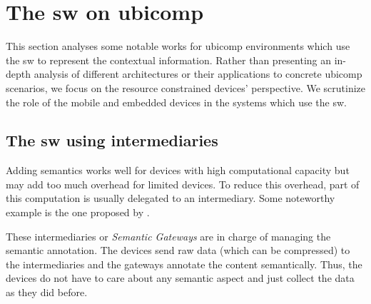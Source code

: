 \section{The \acl{sw} on \acs{ubicomp}}
\label{sec:soa_sw_ubicomp}


This section analyses some notable works for \ac{ubicomp} environments which use the \acf{sw} to represent the contextual information.
Rather than presenting an in-depth analysis of different architectures or their applications to concrete \ac{ubicomp} scenarios,
we focus on the resource constrained devices' perspective.
We scrutinize the role of the mobile and embedded devices in the systems which use the \ac{sw}.




\subsection{The \acl{sw} using intermediaries}
\label{sec:sw_intermediaries}




Adding semantics works well for devices with high computational capacity but may add too much overhead for limited devices.
To reduce this overhead, part of this computation is usually delegated to an intermediary.
Some noteworthy example is the one proposed by \citet{broring_semantic_2009}.




These intermediaries or \emph{Semantic Gateways} are in charge of managing the semantic annotation.
The devices send raw data (which can be compressed) to the intermediaries and the gateways annotate the content semantically.
Thus, the devices do not have to care about any semantic aspect and just collect the data as they did before.

